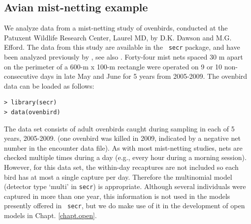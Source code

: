 \subsection{Avian mist-netting example}
\label{poisson-mn.sec.ovenbird}

We analyze data from a mist-netting study of ovenbirds, conducted at
the Patuxent Wildlife Research Center, Laurel MD, by D.K. Dawson and
M.G.  Efford. The data from this study are available in the \mbox{\tt
  secr} package, and have been analyzed previously by
\citet{efford_etal:2004}, see also \citet{borchers_efford:2008}.
Forty-four mist nets spaced 30 m apart on the perimeter of a 600-m x
100-m rectangle were operated on 9 or 10 non-consecutive days in late
May and June for 5 years from 2005-2009.
The ovenbird
data can be loaded as follows:
\begin{verbatim}
> library(secr)
> data(ovenbird)
\end{verbatim}
The data set consists of adult ovenbirds caught during sampling in each
of 5 years, 2005-2009. (one ovenbird was killed in 2009, indicated by
a negative net number in the encounter data file).
As with most mist-netting studies, nets are checked multiple times
during a day (e.g., every hour during a morning session). However, for
this data set, the within-day recaptures are not included so each bird
has at most a single capture per day. Therefore the multinomial model
(detector type `multi' in \mbox{\tt secr}) is appropriate.
 Although
several individuals were captured in more than one year, this
information is not used in the models presently offered in \mbox{\tt
  secr}, but we do make use of it in the development of open models in
Chapt. \ref{chapt.open}.
%


